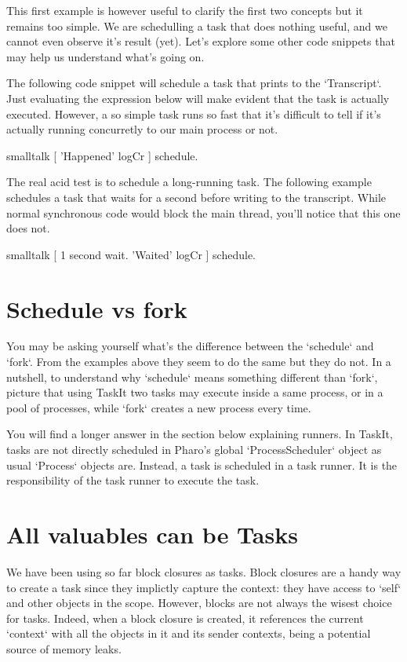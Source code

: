 \documentclass[10pt,twoside,english]{_support/latex/sbabook/sbabook}
\begin{document}
This first example is however useful to clarify the first two concepts but it remains too simple. We are schedulling a task that does nothing useful, and we cannot even observe it's result (yet). Let's explore some other code snippets that may help us understand what's going on.

The following code snippet will schedule a task that prints to the `Transcript`. Just evaluating the expression below will make evident that the task is actually executed. However, a so simple task runs so fast that it's difficult to tell if it's actually running concurretly to our main process or not.

\begin{displaycode}{smalltalk}
[ 'Happened' logCr ] schedule.
\end{displaycode}

The real acid test is to schedule a long-running task. The following example schedules a task that waits for a second before writing to the transcript. While normal synchronous code would block the main thread, you'll notice that this one does not. 

\begin{displaycode}{smalltalk}
[ 1 second wait.
'Waited' logCr ] schedule.
\end{displaycode}
\section{Schedule vs fork}
You may be asking yourself what's the difference between the `schedule` and `fork`. From the examples above they seem to do the same but they do not. In a nutshell, to understand why `schedule` means something different than `fork`, picture that using TaskIt two tasks may execute inside a same process, or in a pool of processes, while `fork` creates a new process every time.

You will find a longer answer in the section below explaining runners. In TaskIt, tasks are not directly scheduled in Pharo's global `ProcessScheduler` object as usual `Process` objects are. Instead, a task is scheduled in a task runner. It is the responsibility of the task runner to execute the task.
\section{All valuables can be Tasks}
We have been using so far block closures as tasks. Block closures are a handy way to create a task since they implictly capture the context: they have access to `self` and other objects in the scope. However, blocks are not always the wisest choice for tasks. Indeed, when a block closure is created, it references the current `context` with all the objects in it and its sender contexts, being a potential source of memory leaks.
\end{document}
